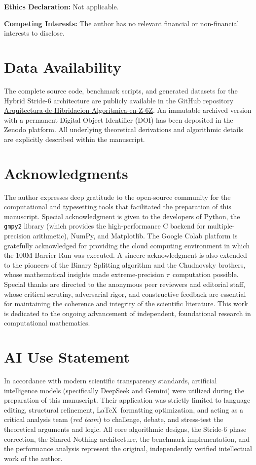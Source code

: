 \documentclass[12pt,a4paper]{article}
\theoremstyle{plain}
\theoremstyle{definition}
\theoremstyle{remark}
\begin{document}
\vspace{0.5em}
\noindent\textbf{Ethics Declaration:} Not applicable.

\vspace{0.5em}
\noindent\textbf{Competing Interests:} The author has no relevant financial or non-financial interests to disclose.

\section*{Data Availability}
The complete source code, benchmark scripts, and generated datasets for the Hybrid Stride-6 architecture are publicly available in the GitHub repository \href{https://github.com/NachoPeinador/Arquitectura-de-Hibridacion-Algoritmica-en-Z-6Z}{Arquitectura-de-Hibridacion-Algoritmica-en-Z-6Z}. An immutable archived version with a permanent Digital Object Identifier (DOI) has been deposited in the Zenodo platform. All underlying theoretical derivations and algorithmic details are explicitly described within the manuscript.

\section*{Acknowledgments}
The author expresses deep gratitude to the open-source community for the computational and typesetting tools that facilitated the preparation of this manuscript. Special acknowledgment is given to the developers of Python, the \texttt{gmpy2} library (which provides the high-performance C backend for multiple-precision arithmetic), NumPy, and Matplotlib. The Google Colab platform is gratefully acknowledged for providing the cloud computing environment in which the 100M Barrier Run was executed. A sincere acknowledgment is also extended to the pioneers of the Binary Splitting algorithm and the Chudnovsky brothers, whose mathematical insights made extreme-precision \(\pi\) computation possible. Special thanks are directed to the anonymous peer reviewers and editorial staff, whose critical scrutiny, adversarial rigor, and constructive feedback are essential for maintaining the coherence and integrity of the scientific literature. This work is dedicated to the ongoing advancement of independent, foundational research in computational mathematics.

\section*{AI Use Statement}
In accordance with modern scientific transparency standards, artificial intelligence models (specifically DeepSeek and Gemini) were utilized during the preparation of this manuscript. Their application was strictly limited to language editing, structural refinement, \LaTeX\ formatting optimization, and acting as a critical analysis team (\textit{red team}) to challenge, debate, and stress-test the theoretical arguments and logic. All core algorithmic designs, the Stride-6 phase correction, the Shared-Nothing architecture, the benchmark implementation, and the performance analysis represent the original, independently verified intellectual work of the author.
\end{document}
